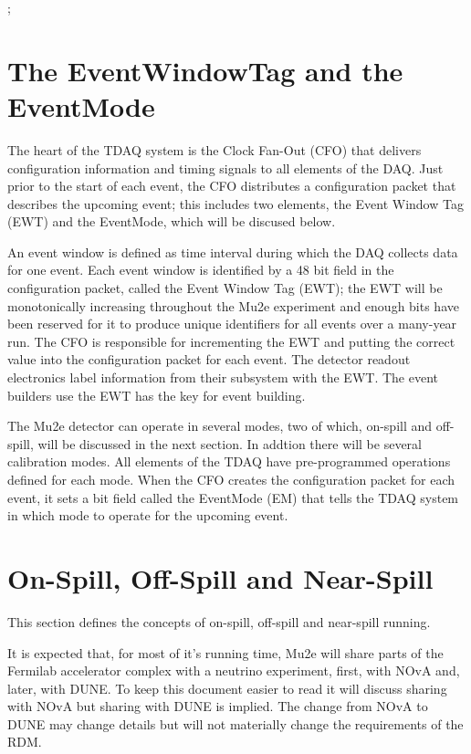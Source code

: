 ;

\section{The EventWindowTag and the EventMode}
\label{sec:EWTagAndEventMode}

The heart of the TDAQ system is the Clock Fan-Out (CFO) that delivers
configuration information and timing signals to all elements of the DAQ.
Just prior to the start of each event, the CFO distributes a configuration packet
that describes the upcoming event;
this includes two elements, the Event Window Tag (EWT) and the EventMode, which will be discused below.


An event window is defined as time interval during which the DAQ collects data for one event.
Each event window is identified by a 48 bit field in the configuration packet, called
the Event Window Tag (EWT);
the EWT will be monotonically increasing throughout the Mu2e experiment and
enough bits have been reserved for it to produce unique identifiers for all
events over a many-year run.
The CFO is responsible for incrementing the EWT and putting the correct value into
the configuration packet for each event.
The detector readout electronics label information from their subsystem with the EWT.
The event builders use the EWT has the key for event building.

The Mu2e detector can operate in several modes, two of which,
on-spill and off-spill, will be discussed in the next section.
In addtion there will be several calibration modes.
All elements of the TDAQ have pre-programmed operations defined for each mode.
When the CFO creates the configuration packet for each event,
it sets a bit field called the EventMode (EM)
that tells the TDAQ system in which mode to operate for the upcoming event.

\section{On-Spill, Off-Spill and Near-Spill}

This section defines the concepts of on-spill, off-spill and near-spill running.

It is expected that, for most of it's running time,
Mu2e will share parts of the Fermilab accelerator complex with a neutrino experiment,
first, with NOvA and, later, with DUNE.
To keep this document easier to read it will discuss sharing with NOvA but sharing with DUNE is implied.
The change from NOvA to DUNE may change details
but will not materially change the requirements of the RDM.

